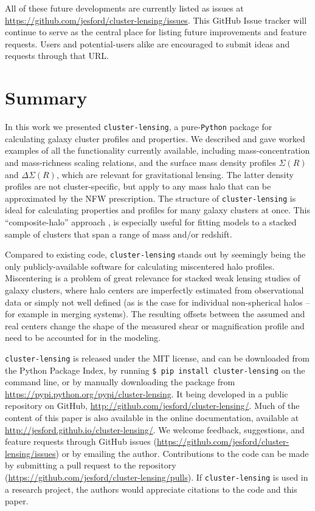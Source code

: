 \documentclass[twocolumn]{aastex6}
\newcommand{\code}{\lstinline[style=codeintext]}
\begin{document}
All of these future developments are currently listed as issues at \url{https://github.com/jesford/cluster-lensing/issues}. This GitHub Issue tracker will continue to serve as the central place for listing future improvements and feature requests. Users and potential-users alike are encouraged to submit ideas and requests through that URL.


\section{Summary}
\label{summary}

In this work we presented \code{cluster-lensing}, a pure-\code{Python} package for calculating galaxy cluster profiles and properties. We described and gave worked examples of all the functionality currently available, including mass-concentration and mass-richness scaling relations, and the surface mass density profiles $\Sigma(R)$ and $\Delta\Sigma(R)$, which are relevant for gravitational lensing. The latter density profiles are not cluster-specific, but apply to any mass halo that can be approximated by the NFW prescription. The structure of \code{cluster-lensing} is ideal for calculating properties and profiles for many galaxy clusters at once. This ``composite-halo'' approach \citep[i.e.][]{Ford15}, is especially useful for fitting models to a stacked sample of clusters that span a range of mass and/or redshift.

Compared to existing code, \code{cluster-lensing} stands out by seemingly being the only publicly-available software for calculating miscentered halo profiles. Miscentering is a problem of great relevance for stacked weak lensing studies of galaxy clusters, where halo centers are imperfectly estimated from observational data or simply not well defined (as is the case for individual non-spherical halos -- for example in merging systems). The resulting offsets between the assumed and real centers change the shape of the measured shear or magnification profile and need to be accounted for in the modeling. 

\code{cluster-lensing} is released under the MIT license, and can be downloaded from the Python Package Index, by running \code{$ pip install cluster-lensing} on the command line, or by manually downloading the package from \url{https://pypi.python.org/pypi/cluster-lensing}. It being developed in a public repository on GitHub, \url{http://github.com/jesford/cluster-lensing/}. Much of the content of this paper is also available in the online documentation, available at \url{http://jesford.github.io/cluster-lensing/}. We welcome feedback, suggestions, and feature requests through GitHub issues (\url{https://github.com/jesford/cluster-lensing/issues}) or by emailing the author. Contributions to the code can be made by submitting a pull request to the repository (\url{https://github.com/jesford/cluster-lensing/pulls}). If \code{cluster-lensing} is used in a research project, the authors would appreciate citations to the code \citep[i.e.][]{clusterlensing} and this paper.
\end{document}
